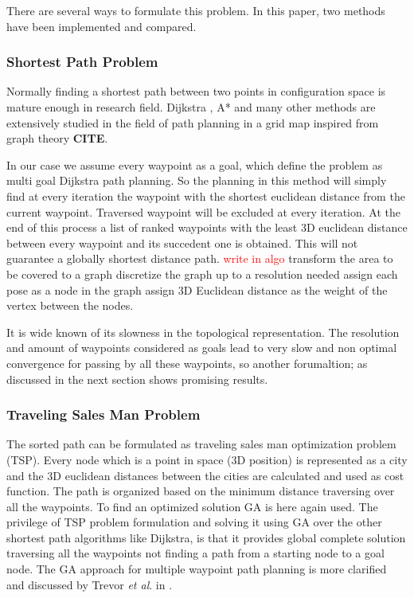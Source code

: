 There are several ways to formulate this problem. In this paper, two methods have been implemented and compared.
\subsubsection{Shortest Path Problem}

Normally finding a shortest path between two points in configuration space is mature enough in research field. Dijkstra , A* and many other methods are extensively studied in the field of path planning in a grid  map inspired from graph theory \textbf{CITE}.

In our case we assume every waypoint as a goal, which define the problem as multi goal Dijkstra path planning.  So the planning in this method will simply find at every iteration the waypoint with the shortest euclidean distance from the current waypoint. Traversed waypoint will be excluded at every iteration. At the end of this process a list of ranked waypoints with the least 3D euclidean distance between every waypoint and its succedent one is obtained. This will not guarantee a globally shortest distance path.
\textcolor{red}{write in algo }
transform the area to be covered to a graph %
discretize the graph up to a resolution needed 
assign each pose as a node in the graph
assign 3D Euclidean distance as the weight of the vertex between the nodes.

It is wide known of its slowness in the topological representation. The resolution and amount of waypoints considered as goals lead to very slow and non optimal convergence for passing by all these waypoints, so another forumaltion; as discussed in the next section shows promising results.

\subsubsection{Traveling Sales Man Problem }
The sorted path can be formulated as traveling sales man optimization problem (TSP). Every node which is a point in space (3D position) is represented as a city and the 3D euclidean distances between the cities are calculated and used as cost function. The path is organized based on the minimum distance traversing over all the waypoints. To find an optimized solution GA is here again used. The privilege of TSP problem formulation and solving it using GA over the other shortest path algorithms like Dijkstra, is that it provides global  complete solution traversing all the waypoints not finding a path from a starting node to a goal node. The GA approach for multiple waypoint path planning is more clarified and discussed by Trevor \textit{et al}. in \cite{davies2006multiple}.


